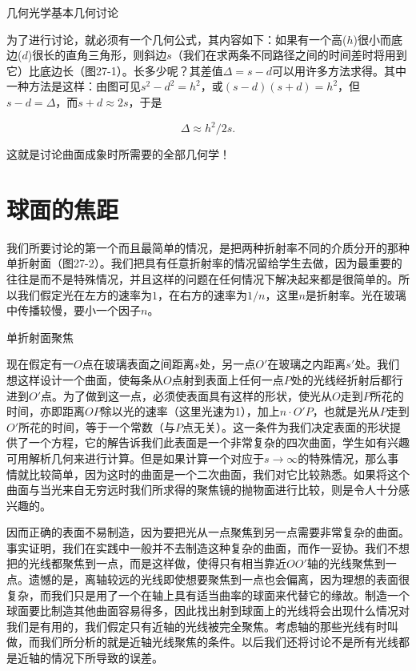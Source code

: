 \documentclass[11pt,oneside]{book}
\begin{document}
\begin{common-format}
\begin{fig}{几何光学基本几何讨论}
\label{fig:几何光学基本几何讨论}
\end{fig}

为了进行讨论，就必须有一个几何公式，其内容如下：如果有一个高($ h $)很小而底边($ d $)很长的直角三角形，则斜边$ s $（我们在求两条不同路径之间的时间差时将用到它）比底边长（图27-1）。长多少呢？其差值$ \Delta = s - d $可以用许多方法求得。其中一种方法是这样：由图可见$ s^2 - d^2 = h^2 $，或$ (s - d)(s + d) = h^2 $，但 $ s - d = \Delta $，而$ s + d \approx 2s $，于是

\begin{equation}
\label{Eq:I:27:1}
\Delta \approx h^2/2s.
\end{equation}

这就是讨论曲面成象时所需要的全部几何学！



\section{球面的焦距}
我们所要讨论的第一个而且最简单的情况，是把两种折射率不同的介质分开的那种单折射面（图27-2）。我们把具有任意折射率的情况留给学生去做，因为最重要的往往是而不是特殊情况，并且这样的问题在任何情况下解决起来都是很简单的。所以我们假定光在左方的速率为$ 1 $，在右方的速率为$ 1/n $，这里$ n $是折射率。光在玻璃中传播较慢，要小一个因子$ n $。

\begin{fig}{单折射面聚焦}
\label{fig:单折射面聚焦}
\end{fig}

现在假定有一$ O $点在玻璃表面之间距离$ s $处，另一点$ O' $在玻璃之内距离$ s' $处。我们想这样设计一个曲面，使每条从$ O $点射到表面上任何一点$ P $处的光线经折射后都行进到$ O' $点。为了做到这一点，必须使表面具有这样的形状，使光从$ O $走到$ P $所花的时间，亦即距离$ OP $除以光的速率（这里光速为1），加上$ n \cdot O'P $，也就是光从$ P $走到$ O' $所花的时间，等于一个常数（与$ P $点无关）。这一条件为我们决定表面的形状提供了一个方程，它的解告诉我们此表面是一个非常复杂的四次曲面，学生如有兴趣可用解析几何来进行计算。但是如果计算一个对应于$ s \to \infty $的特殊情况，那么事情就比较简单，因为这时的曲面是一个二次曲面，我们对它比较熟悉。如果将这个曲面与当光来自无穷远时我们所求得的聚焦镜的抛物面进行比较，则是令人十分感兴趣的。

因而正确的表面不易制造，因为要把光从一点聚焦到另一点需要非常复杂的曲面。事实证明，我们在实践中一般并不去制造这种复杂的曲面，而作一妥协。我们不想把的光线都聚焦到一点，而是这样做，使得只有相当靠近$ OO' $轴的光线聚焦到一点。遗憾的是，离轴较远的光线即使想要聚焦到一点也会偏离，因为理想的表面很复杂，而我们只是用了一个在轴上具有适当曲率的球面来代替它的缘故。制造一个球面要比制造其他曲面容易得多，因此找出射到球面上的光线将会出现什么情况对我们是有用的，我们假定只有近轴的光线被完全聚焦。考虑轴的那些光线有时叫做，而我们所分析的就是近轴光线聚焦的条件。以后我们还将讨论不是所有光线都是近轴的情况下所导致的误差。


\end{common-format}
\end{document}
